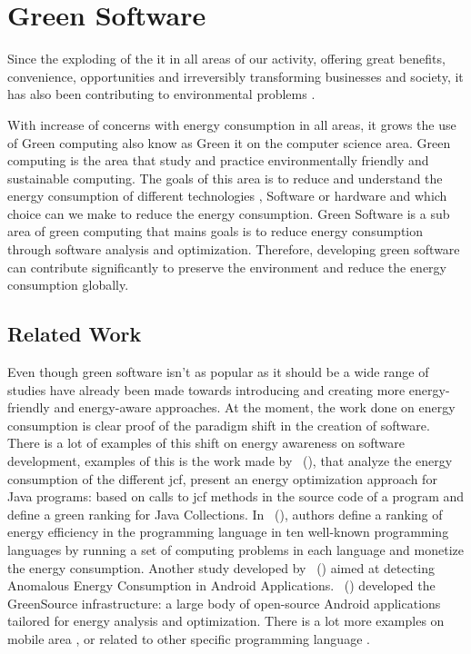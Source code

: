 \section{Green Software}

Since the exploding of the \gls{it} in all areas of our activity, offering great benefits, convenience, opportunities and irreversibly transforming businesses and society, it has also been contributing to environmental problems \cite{makingitgreen}.

With increase of concerns with energy consumption in all areas, it grows the use of Green computing also know as Green \gls{it} on the computer science area. Green computing is the area that study and practice  environmentally friendly and  sustainable computing. The goals of this area is to reduce and understand the energy consumption of different technologies , Software or hardware and which choice can we make to reduce the energy consumption. Green Software is a sub area of green computing that mains goals is to reduce energy consumption through software analysis and optimization. Therefore, developing green software can contribute significantly to preserve the environment and reduce the energy consumption globally. 

\subsection{Related Work}

Even though green software isn't as popular as it should be a wide range of studies have already been made towards introducing and creating more energy-friendly and energy-aware approaches. At the moment, the work done on energy consumption is clear proof of the paradigm shift in the creation of software. There is a lot of examples of this shift on energy awareness on software development, examples of this is the work made by \citeauthor{javaenergy}~(\citeyear{javaenergy}), that analyze the energy consumption of the different \gls{jcf}, present an energy optimization approach for Java programs: based on calls to \gls{jcf} methods in the source code of a program and define a green ranking for Java Collections. In \citeauthor{10.1145/3125374.3125382}~(\citeyear{10.1145/3125374.3125382}), authors define a ranking of energy efficiency in the programming language in ten well-known programming languages by running a set of computing problems in each language and monetize the energy consumption. Another study developed by \citeauthor{10.1007/978-3-319-11863-5_6}~(\citeyear{10.1007/978-3-319-11863-5_6}) aimed at detecting Anomalous Energy Consumption in Android Applications. \citeauthor{8816732}~(\citeyear{8816732}) developed the GreenSource infrastructure: a large body of open-source Android applications tailored for energy analysis and optimization. There is a lot more examples on mobile area \cite{10.1145/3387905.3388600,9054858,10.1109/MSR.2019.00034,Rua2019TowardsUM,cruz2019catalog,cruzenery,7972807}, or related to other specific programming language \cite{7965265,PEREIRA2020110463,LIMA2019554,pereira2017energy,carccao2014measuring,7965316}. 

